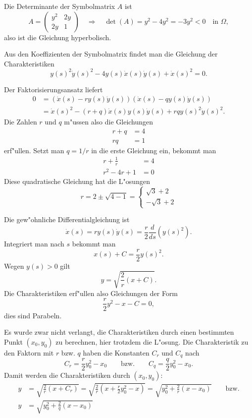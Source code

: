 \begin{loesung}
\begin{teilaufgaben}
\item
Die Determinante der Symbolmatrix $A$ ist
\[
A=\begin{pmatrix}
y^2&2y\\
2y&1
\end{pmatrix}
\quad\Rightarrow\quad
\det (A)=y^2-4y^2=-3y^2<0 \quad\text{in $\Omega$},
\]
also ist die Gleichung hyperbolisch.
\item
Aus den Koeffizienten der Symbolmatrix findet man die Gleichung
der Charakteristiken
\[
y(s)^2\dot y(s)^2-4y(s)\dot x(s)\dot y(s)+\dot x(s)^2=0.
\]
\item
Der Faktorisierungsansatz liefert
\begin{align*}
0&=(\dot x(s)-ry(s)\dot y(s))(\dot x(s)-qy(s)\dot y(s))
\\
&=\dot x(s)^2-(r+q)\dot x(s) y(s)\dot y(s)+rqy(s)^2\dot y(s)^2.
\end{align*}
Die Zahlen $r$ und $q$ m"ussen also die Gleichungen
\begin{align*}
r+q&=4\\
rq&=1
\end{align*}
erf"ullen. Setzt man $q=1/r$ in die erste Gleichung ein, bekommt man
\begin{align*}
r+\frac1r&=4\\
r^2-4r+1&=0
\end{align*}
Diese quadratische Gleichung hat die L"osungen
\[
r
=
2\pm\sqrt{4-1}
=
\begin{cases}
\sqrt{3}+2\\
-\sqrt{3}+2
\end{cases}
\]
\item
Die gew"ohnliche Differentialgleichung ist
\[
\dot x(s)=ry(s)\dot y(s)=\frac{r}{2}\frac{d}{ds}(y(s)^2).
\]
Integriert man nach $s$ bekommt man
\[
x(s) + C=\frac{r}{2}y(s)^2.
\]
Wegen $y(s)>0$ gilt
\[
y = \sqrt{\frac{2}{r}(x+C)}.
\]
Die Charakteristiken erf"ullen also Gleichungen der Form
\[
\frac{r}2y^2-x-C=0,
\]
dies sind Parabeln.
\end{teilaufgaben}
Es wurde zwar nicht verlangt, die Charakteristiken durch einen
bestimmten Punkt $(x_0,y_0)$ zu berechnen, hier trotzdem die
L"osung. Die Charakteristik zu den Faktorn mit $r$ bzw. $q$ haben
die Konstanten $C_r$ und $C_q$ nach
\[
C_r=\frac{r}{2}y_0^2-x_0
\qquad
\text{bzw.}
\qquad
C_q=\frac{q}{2}y_0^2-x_0.
\]
Damit werden die Charakteristiken durch $(x_0,y_0)$:
\begin{align*}
y&=\sqrt{
\frac2r(x+C_r)
}
=
\sqrt{
\frac2r(x+
\frac{r}{2}y_0^2-x
)
}
=\sqrt{y_0^2+\frac2r(x-x_0)}
\qquad\text{bzw.}
\\
y&
=\sqrt{y_0^2+\frac2q(x-x_0)}
\end{align*}
\end{loesung}
